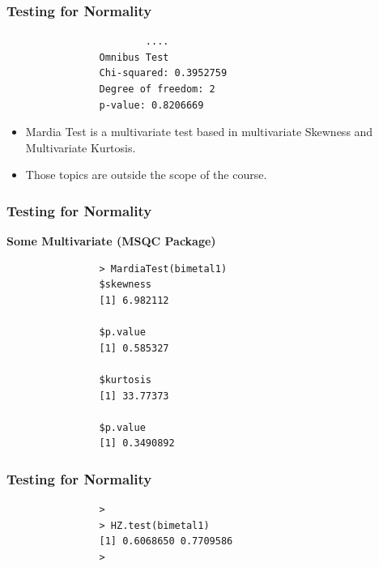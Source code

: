 \documentclass{beamer}
\begin{document}
				\begin{frame}[fragile]
					\frametitle{Testing for Normality}
					\begin{framed}
						\begin{verbatim}
						....
				Omnibus Test
				Chi-squared: 0.3952759 
				Degree of freedom: 2
				p-value: 0.8206669 
				\end{verbatim}
			\end{framed}
				\end{frame}
				\begin{frame}[fragile]
					\begin{itemize}
						\item Mardia Test is a multivariate test based in multivariate Skewness and Multivariate Kurtosis. 
						\item Those topics are outside the scope of the course.
						
					\end{itemize}
				\end{frame}
\begin{frame}[fragile]
			\frametitle{Testing for Normality}
			\textbf{Some Multivariate (MSQC Package)}
			\begin{framed}
				\begin{verbatim}
				> MardiaTest(bimetal1)
				$skewness
				[1] 6.982112
				
				$p.value
				[1] 0.585327
				
				$kurtosis
				[1] 33.77373
				
				$p.value
				[1] 0.3490892
						\end{verbatim}
					\end{framed}
				\end{frame}
				\begin{frame}[fragile]
				\frametitle{Testing for Normality}
				\begin{framed}
					\begin{verbatim}
				>
				> HZ.test(bimetal1)
				[1] 0.6068650 0.7709586
				> 
						\end{verbatim}
					\end{framed}
				\end{frame}
\end{document}
